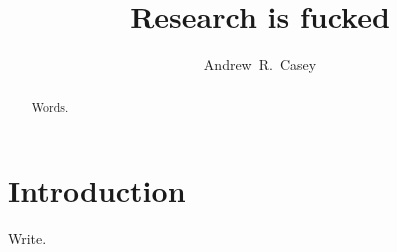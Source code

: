 \documentclass[preprint]{aastex}
\begin{document}
\title{Research is fucked}

\author{
  Andrew~R.~Casey
}


\begin{abstract}
Words.
\end{abstract}


\keywords{}


\section{Introduction} 
\label{sec:introduction}
Write.
\end{document}
